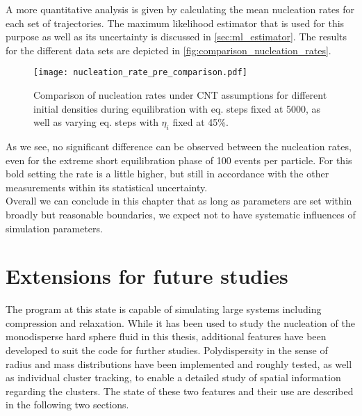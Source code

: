 A more quantitative analysis is given by calculating the mean nucleation rates for each set of trajectories. The maximum likelihood estimator that is used for this purpose as well as its uncertainty is discussed in \autoref{sec:ml_estimator}. The results for the different data sets are depicted in \autoref{fig:comparison_nucleation_rates}.
\begin{figure}[h!]
\centering
\texttt{[image: nucleation\_rate\_pre\_comparison.pdf]}
\caption[Nucleation rates of equilibration test measurements]{Comparison of nucleation rates under CNT assumptions for different initial densities during equilibration with eq. steps fixed at 5000, as well as varying eq. steps with $\eta_i$ fixed at 45\%. }
\label{fig:comparison_nucleation_rates}
\end{figure}

As we see, no significant difference can be observed between the nucleation rates, even for the extreme short equilibration phase of 100 events per particle. For this bold setting the rate is a little higher, but still in accordance with the other measurements within its statistical uncertainty.\\

Overall we can conclude in this chapter that as long as parameters are set within broadly but reasonable boundaries, we expect not to have systematic influences of simulation parameters. 

\section{Extensions for future studies}
\label{sec:simulation_ext}
The program at this state is capable of simulating large systems including compression and relaxation. While it has been used to study the nucleation of the monodisperse hard sphere fluid in this thesis, additional features have been developed to suit the code for further studies. Polydispersity in the sense of radius and mass distributions have been implemented and roughly tested, as well as individual cluster tracking, to enable a detailed study of spatial information regarding the clusters. The state of these two features and their use are described in the following two sections.

